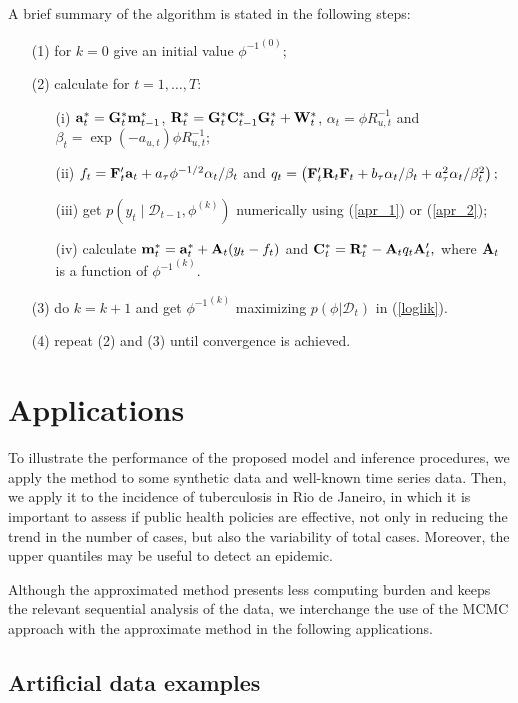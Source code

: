\documentclass[12pt,a4paper]{article}\usepackage[]{graphicx}\usepackage[]{color}\usepackage{subfigure}
\newcommand{\mathD}{\mathcal{D}}
\begin{document}
A brief summary of the algorithm is stated in the following steps: 
\begin{itemize}
 \item [(1)] for $k=0$ give an initial value ${\phi^{-1}}^{(0)};$
\item [(2)] calculate for $t=1,\dots,T$:
\begin{itemize}
\item [(i)] ${\bf a}^*_t={\bf G}^*_t{\bf m}^*_{t-1}$, ${\bf R}^*_t={\bf G}^*_t{\bf C}^*_{t-1}{\bf G}^*_t+{\bf W}_t^*$, $\alpha_t = \phi R_{u,t}^{-1}$ and $\beta_t=\exp(-a_{u,t})\phi R_{u,t}^{-1};$
\item [(ii)] $f_t = {\bf F}_t'{\bf a}_t + a_{\tau}\phi^{-1/2}\alpha_t/\beta_t$ and $q_t=\left({\bf F}_t'{\bf R}_{t} {\bf F}_t + b_{\tau}\alpha_t/\beta_t+a_\tau^2\alpha_t/\beta_t^2\right);$
\item [(iii)] get $p(y_t\mid\mathD_{t-1},\phi^{(k)})$ numerically using (\ref{apr_1}) or (\ref{apr_2});
\item [(iv)] calculate ${\bf m}^*_{t}={\bf a}^*_t+{\bf A}_t(y_t-f_t)$ and ${\bf C}_t^* = {\bf R}^*_t - {\bf A}_tq_t {\bf A}'_t,$ where ${\bf A}_t$ is a function of ${\phi^{-1}}^{(k)}$.
\end{itemize}
\item [(3)] do $k = k+1$ and get ${\phi^{-1}}^{(k)}$ maximizing $p(\phi | \mathD_t)$ in (\ref{loglik}).
\item [(4)] repeat (2) and (3) until convergence is achieved.
\end{itemize}


\section{Applications}

To illustrate the performance of the proposed model and inference procedures, we apply the method to some synthetic data and well-known time series data. 
Then, we apply it to the incidence of tuberculosis in Rio de Janeiro, in which it is important to assess if public health policies are effective, not only in reducing the trend in the number of cases, but also the variability of total cases. 
Moreover, the upper quantiles may be useful to detect an epidemic.

Although the approximated method presents less computing burden and keeps the relevant sequential analysis of the data, 
we interchange the use of the MCMC approach with the approximate method in the following applications.

\subsection {Artificial data examples}
\end{document}
